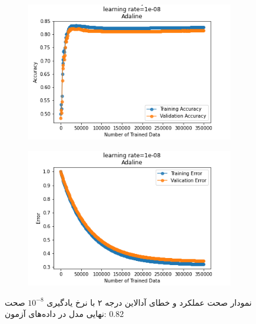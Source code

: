 \documentclass[12pt, a4paper]{article}
\begin{document}
\begin{figure}[h]
    \begin{subfigure}{0.45\linewidth}
        \centering
        \includegraphics[width=\linewidth]{images/6/adaline/lr/acc_1e-08.png}
    \end{subfigure}
    \hfil
    \begin{subfigure}{0.45\linewidth}
        \centering
        \includegraphics[width=\linewidth]{images/6/adaline/lr/error_1e-08.png}
    \end{subfigure}
    \caption{نمودار صحت عملکرد‌ و خطای آدالاین درجه ۲ با نرخ یادگیری $10^{-8}$
    \newline
    صحت نهایی مدل در داده‌های آزمون: $0.82$}
\end{figure}
\end{document}
